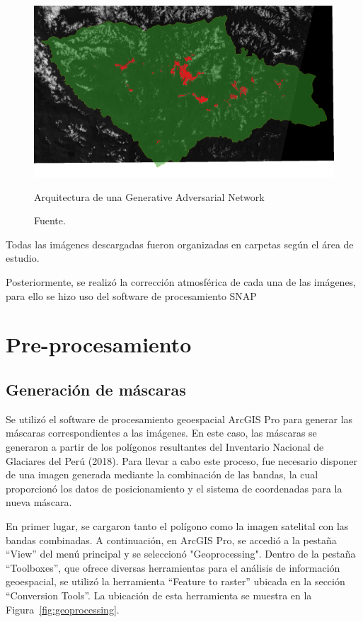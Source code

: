 \documentclass[12pt]{report}
\begin{document}
\begin{figure}[H]
   \centering
   \includegraphics[width=1\textwidth]{Images/imagen_vilcabamba.png}
   \label{fig:gan2}
   \caption{Arquitectura de una Generative Adversarial Network}
   \caption*{Fuente. }
\end{figure}



Todas las imágenes descargadas fueron organizadas en carpetas según el área de estudio.

Posteriormente, se realizó la corrección atmosférica de cada una de las imágenes, para ello se hizo uso del software de procesamiento SNAP




\section{Pre-procesamiento}

\subsection{Generación de máscaras}

Se utilizó el software de procesamiento geoespacial ArcGIS Pro para generar las máscaras correspondientes a las imágenes. En este caso, las máscaras se generaron a partir de los polígonos resultantes del Inventario Nacional de Glaciares del Perú (2018). Para llevar a cabo este proceso, fue necesario disponer de una imagen generada mediante la combinación de las bandas, la cual proporcionó los datos de posicionamiento y el sistema de coordenadas para la nueva máscara.

En primer lugar, se cargaron tanto el polígono como la imagen satelital con las bandas combinadas. A continuación, en ArcGIS Pro, se accedió a la pestaña “View” del menú principal y se seleccionó "Geoprocessing". Dentro de la pestaña “Toolboxes”, que ofrece diversas herramientas para el análisis de información geoespacial, se utilizó la herramienta “Feature to raster” ubicada en la sección “Conversion Tools”. La ubicación de esta herramienta se muestra en la Figura~\ref{fig:geoprocessing}.
\end{document}
